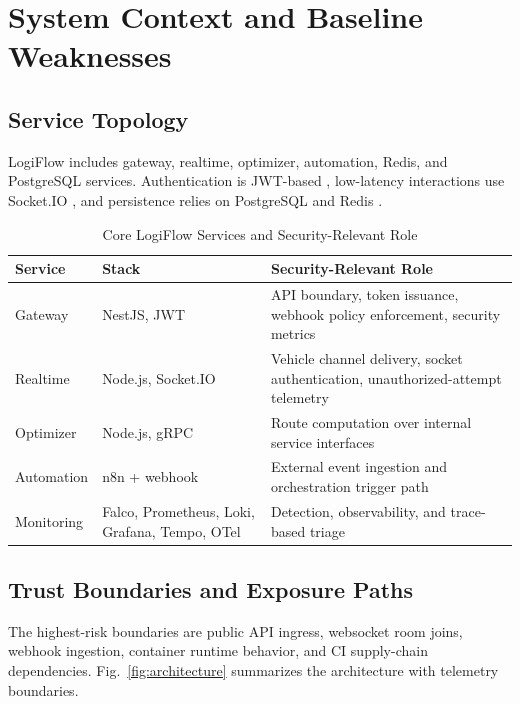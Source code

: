\documentclass[conference]{IEEEtran}
\begin{document}
\section{System Context and Baseline Weaknesses}
\subsection{Service Topology}
LogiFlow includes gateway, realtime, optimizer, automation, Redis, and PostgreSQL services. Authentication is JWT-based \cite{jwtRFC7519}, low-latency interactions use Socket.IO \cite{socketio}, and persistence relies on PostgreSQL and Redis \cite{postgresql,redis}.

\begin{table}[!t]
\caption{Core LogiFlow Services and Security-Relevant Role}
\centering
\footnotesize
\begin{tabularx}{\linewidth}{>{\raggedright\arraybackslash}p{1.52cm} >{\raggedright\arraybackslash}p{1.4cm} Y}
\toprule
Service & Stack & Security-Relevant Role \\
\midrule
Gateway & NestJS, JWT & API boundary, token issuance, webhook policy enforcement, security metrics \\
Realtime & Node.js, Socket.IO & Vehicle channel delivery, socket authentication, unauthorized-attempt telemetry \\
Optimizer & Node.js, gRPC & Route computation over internal service interfaces \\
Automation & n8n + webhook & External event ingestion and orchestration trigger path \\
Monitoring & Falco, Prometheus, Loki, Grafana, Tempo, OTel & Detection, observability, and trace-based triage \\
\bottomrule
\end{tabularx}
\label{tab:services}
\end{table}

\subsection{Trust Boundaries and Exposure Paths}
The highest-risk boundaries are public API ingress, websocket room joins, webhook ingestion, container runtime behavior, and CI supply-chain dependencies. Fig.~\ref{fig:architecture} summarizes the architecture with telemetry boundaries.
\end{document}
